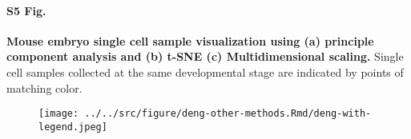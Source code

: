 \documentclass[10pt,letterpaper]{article}
\begin{document}
\paragraph*{S5 Fig.}

\label{figS5}
{\bf Mouse embryo single cell sample visualization using (a) principle component analysis and (b) t-SNE
(c) Multidimensional scaling.}
Single cell samples collected at the same developmental stage are indicated by points of matching color.
\begin{figure}[ht]
\centering
\texttt{[image: ../../src/figure/deng-other-methods.Rmd/deng-with-legend.jpeg]}
\end{figure}
\end{document}
